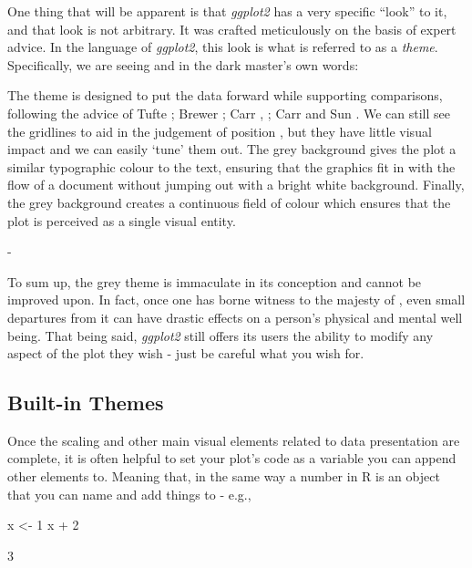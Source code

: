 One thing that will be apparent is that \textit{ggplot2} has a very specific ``look'' to it, and that look is not arbitrary. It was crafted meticulously on the basis of expert advice. In the language of \textit{ggplot2}, this look is what is referred to as a \textit{theme}.  Specifically, we are seeing  and in the dark master's own words:

\begin{displayquote}
\headingfont
The theme is designed to put the data forward while supporting comparisons, following the advice of Tufte \citeyear{Tufte2006}; Brewer \citeyear{Brewer1994}; Carr \citeyear{Carr2002}, \citeyear{Carr1994}; Carr and Sun \citeyear{Carr1999}. We can still see the gridlines to aid in the judgement of position \parencite{Cleveland1993}, but they have little visual impact and we can easily `tune' them out. The grey background gives the plot a similar typographic colour to the text, ensuring that the graphics fit in with the flow of a document without jumping out with a bright white background. Finally, the grey background creates a continuous field of colour which ensures that the plot is perceived as a single visual entity.

- \cite{Wickham_ggplot2}

\end{displayquote}

\noindent
To sum up, the grey theme is immaculate in its conception and cannot be improved upon. In fact, once one has borne witness to the majesty of , even small departures from it can have drastic effects on a person's physical and mental well being. That being said, \textit{ggplot2} still offers its users the ability to modify any aspect of the plot they wish - just be careful what you wish for.

\subsection{Built-in Themes}

Once the scaling and other main visual elements related to data presentation are complete, it is often helpful to set your plot's code as a variable you can append other elements to. Meaning that, in the same way a number in R is an object that you can name and add things to - e.g., 

\begin{inR}
x <- 1
x + 2
\end{inR}
\begin{outR}
[1] 3
\end{outR}

